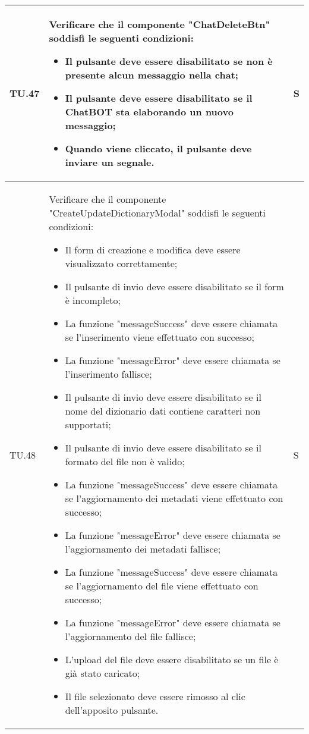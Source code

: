\begin{adjustwidth}{-0.5cm}{-0.5cm}
\begin{longtable}{|P{1.5cm}|>{\raggedright}P{9.5cm}|>{\arraybackslash}P{1.5cm}|}
		\hline TU.47 & Verificare che il componente "ChatDeleteBtn" soddisfi le seguenti condizioni:
    \begin{itemize}
      \item Il pulsante deve essere disabilitato se non è presente alcun messaggio nella chat;
      \item Il pulsante deve essere disabilitato se il ChatBOT sta elaborando un nuovo messaggio;
      \item Quando viene cliccato, il pulsante deve inviare un segnale.
    \end{itemize} & S \\

		\hline TU.48 & Verificare che il componente "CreateUpdateDictionaryModal" soddisfi le seguenti condizioni:
    \begin{itemize}
      \item Il form di creazione e modifica deve essere visualizzato correttamente;
			\item Il pulsante di invio deve essere disabilitato se il form è incompleto;
			\item La funzione "messageSuccess" deve essere chiamata se l'inserimento viene effettuato con successo;
			\item La funzione "messageError" deve essere chiamata se l'inserimento fallisce;
			\item Il pulsante di invio deve essere disabilitato se il nome del dizionario dati contiene caratteri non supportati;
			\item Il pulsante di invio deve essere disabilitato se il formato del file non è valido;
			\item La funzione "messageSuccess" deve essere chiamata se l'aggiornamento dei metadati viene effettuato con successo;
			\item La funzione "messageError" deve essere chiamata se l'aggiornamento dei metadati fallisce;
			\item La funzione "messageSuccess" deve essere chiamata se l'aggiornamento del file viene effettuato con successo;
			\item La funzione "messageError" deve essere chiamata se l'aggiornamento del file fallisce;
			\item L'upload del file deve essere disabilitato se un file è già stato caricato;
			\item Il file selezionato deve essere rimosso al clic dell'apposito pulsante.
    \end{itemize} & S \\


\end{longtable}
\end{adjustwidth}
